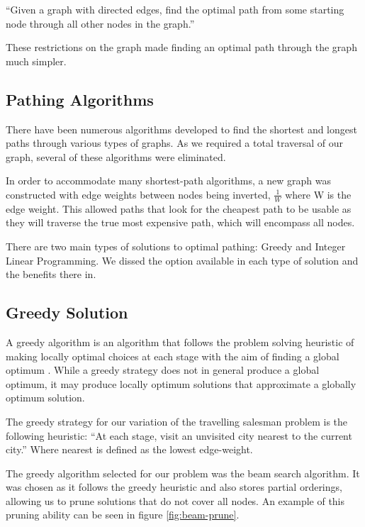 \documentclass[bsc,frontabs,twoside,singlespacing,parskip,deptreport]{infthesis}     %
\begin{document}
\begin{center}
  \enquote{Given a graph with directed edges, find the optimal path from some starting node through all other nodes in
  the graph.}
\end{center}

These restrictions on the graph made finding an optimal path through the graph much simpler.


\subsection{Pathing Algorithms}
There have been numerous algorithms developed to find the shortest and longest paths through various types of graphs.
As we required a total traversal of our graph, several of these algorithms were eliminated.

In order to accommodate many shortest-path algorithms, a new graph was constructed with edge weights between nodes being inverted,
$\frac{1}{W}$ where W is the edge weight. This allowed paths that look for the cheapest path to be usable as they will traverse the
true most expensive path, which will encompass all nodes.

There are two main types of solutions to optimal pathing: Greedy and Integer Linear Programming.
We dissed the option available in each type of solution and the benefits there in.

\subsection{Greedy Solution}
A greedy algorithm is an algorithm that follows the problem solving heuristic of making locally optimal choices at each stage with the aim
of finding a global optimum \cite{black2004dictionary}.
While a greedy strategy does not in general produce a global optimum, it may produce locally optimum solutions that approximate a globally optimum solution.


The greedy strategy for our variation of the travelling salesman problem is the following heuristic:
``At each stage, visit an unvisited city nearest to the current city.''
Where nearest is defined as the lowest edge-weight.


The greedy algorithm selected for our problem was the beam search algorithm.
It was chosen as it follows the greedy heuristic and also stores partial orderings, allowing us to prune solutions that do not cover all nodes.
An example of this pruning ability can be seen in figure \ref{fig:beam-prune}.
\end{document}
